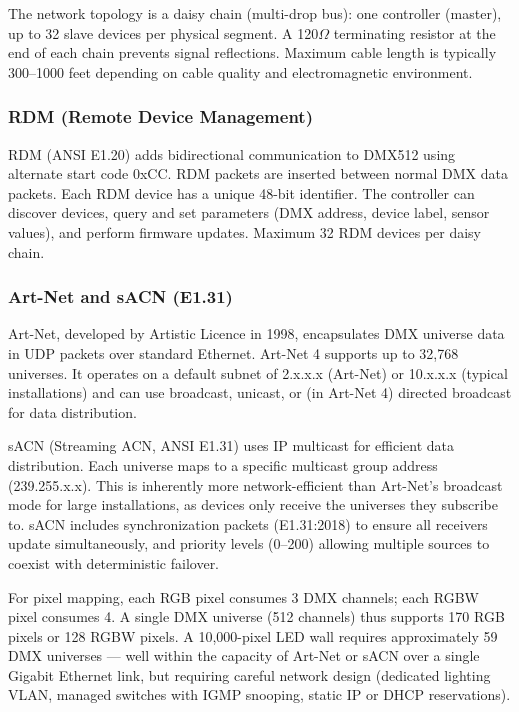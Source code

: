 \documentclass[11pt,letterpaper]{article}
\begin{document}
The network topology is a daisy chain (multi-drop bus): one controller (master), up to 32 slave devices per physical segment. A 120$\Omega$ terminating resistor at the end of each chain prevents signal reflections. Maximum cable length is typically 300--1000 feet depending on cable quality and electromagnetic environment.

\subsubsection{RDM (Remote Device Management)}

RDM (ANSI E1.20) adds bidirectional communication to DMX512 using alternate start code 0xCC. RDM packets are inserted between normal DMX data packets. Each RDM device has a unique 48-bit identifier. The controller can discover devices, query and set parameters (DMX address, device label, sensor values), and perform firmware updates. Maximum 32 RDM devices per daisy chain.

\subsubsection{Art-Net and sACN (E1.31)}

Art-Net, developed by Artistic Licence in 1998, encapsulates DMX universe data in UDP packets over standard Ethernet. Art-Net 4 supports up to 32,768 universes. It operates on a default subnet of 2.x.x.x (Art-Net) or 10.x.x.x (typical installations) and can use broadcast, unicast, or (in Art-Net 4) directed broadcast for data distribution.

sACN (Streaming ACN, ANSI E1.31) uses IP multicast for efficient data distribution. Each universe maps to a specific multicast group address (239.255.x.x). This is inherently more network-efficient than Art-Net's broadcast mode for large installations, as devices only receive the universes they subscribe to. sACN includes synchronization packets (E1.31:2018) to ensure all receivers update simultaneously, and priority levels (0--200) allowing multiple sources to coexist with deterministic failover.

For pixel mapping, each RGB pixel consumes 3 DMX channels; each RGBW pixel consumes 4. A single DMX universe (512 channels) thus supports 170 RGB pixels or 128 RGBW pixels. A 10,000-pixel LED wall requires approximately 59 DMX universes --- well within the capacity of Art-Net or sACN over a single Gigabit Ethernet link, but requiring careful network design (dedicated lighting VLAN, managed switches with IGMP snooping, static IP or DHCP reservations).
\end{document}

